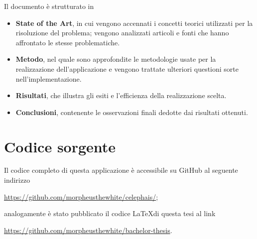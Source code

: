 Il documento è strutturato in 

\begin{itemize}
    \item \textbf{State of the Art}, in cui vengono accennati i concetti teorici utilizzati per la risoluzione 
        del problema; vengono analizzati articoli e fonti che hanno affrontato le stesse problematiche. 
    \item \textbf{Metodo}, nel quale sono approfondite le metodologie usate per la realizzazione 
        dell'applicazione e vengono trattate ulteriori questioni sorte nell'implementazione.
    \item \textbf{Risultati}, che illustra gli esiti e l'efficienza della realizzazione scelta.
    \item \textbf{Conclusioni}, contenente le osservazioni finali dedotte dai risultati ottenuti.
\end{itemize}

\section{Codice sorgente}

Il codice completo di questa applicazione è accessibile su GitHub al seguente 
indirizzo 

\begin{center}
    \url{https://github.com/morpheusthewhite/celephais/}; 
\end{center}

\noindent
analogamente è stato pubblicato il codice \LaTeX di questa tesi al link 

\begin{center}
    \url{https://github.com/morpheusthewhite/bachelor-thesis}.     
\end{center}
